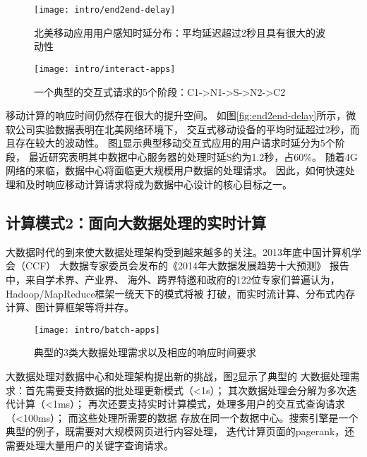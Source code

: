 \begin{figure}
\begin{minipage}{0.48\textwidth}
  \centering
  \texttt{[image: intro/end2end-delay]}
  \caption[北美移动应用用户感知时延分布]{北美移动应用用户感知时延分布：平均延迟超过2秒且具有很大的波动性}
  \label{fig:end2end-delay}
\end{minipage}\hfill
\begin{minipage}{0.48\textwidth}
  \centering
  \texttt{[image: intro/interact-apps]}
  \caption[一个典型的交互式请求的5个阶段]{一个典型的交互式请求的5个阶段：C1->N1->S->N2->C2 \cite{timecard2013}}
  \label{fig:interact-apps}
\end{minipage}
\end{figure}

移动计算的响应时间仍然存在很大的提升空间。
如图\ref{fig:end2end-delay}所示，微软公司实验数据表明在北美网络环境下，
交互式移动设备的平均时延超过2秒，而且存在较大的波动性。
图\ref{fig:interact-apps}显示典型移动交互式应用的用户请求时延分为5个阶段，
最近研究\cite{timecard2013}表明其中数据中心服务器的处理时延S约为1.2秒，占60\%。
随着4G网络的来临，数据中心将面临更大规模用户数据的处理请求。
因此，如何快速处理和及时响应移动计算请求将成为数据中心设计的核心目标之一。


\subsection*{计算模式2：面向大数据处理的实时计算}

大数据时代的到来使大数据处理架构受到越来越多的关注。2013年底中国计算机学会（CCF）
大数据专家委员会发布的《2014年大数据发展趋势十大预测》 报告中，来自学术界、产业界、
海外、跨界特邀和政府的122位专家们普遍认为，Hadoop/MapReduce框架一统天下的模式将被
打破，而实时流计算、分布式内存计算、图计算框架等将并存。

\begin{figure}[H]
  \centering
  \texttt{[image: intro/batch-apps]}
  \caption{典型的3类大数据处理需求以及相应的响应时间要求}
  \label{fig:batch-apps}
\end{figure}


大数据处理对数据中心和处理架构提出新的挑战，图\ref{fig:batch-apps}显示了典型的
大数据处理需求：首先需要支持数据的批处理更新模式（<1s）；
其次数据处理会分解为多次迭代计算（<1ms）；
再次还要支持实时计算模式，处理多用户的交互式查询请求（<100ms）；
而这些处理所需要的数据
存放在同一个数据中心。搜索引擎是一个典型的例子，既需要对大规模网页进行内容处理，
迭代计算页面的pagerank，还需要处理大量用户的关键字查询请求。

